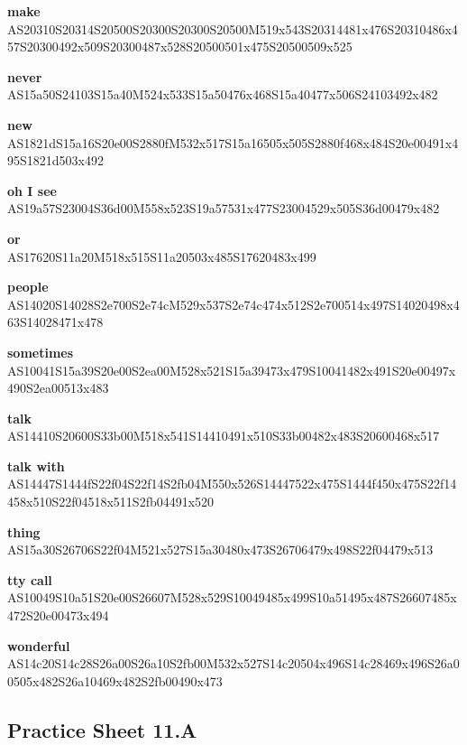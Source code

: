\documentclass{article}
\begin{document}
\begin{glossary}
\textbf{make}\\
AS20310S20314S20500S20300S20300S20500M519x543S20314481x476S20310486x457S20300492x509S20300487x528S20500501x475S20500509x525

\textbf{never}\\
AS15a50S24103S15a40M524x533S15a50476x468S15a40477x506S24103492x482

\textbf{new}\\
AS1821dS15a16S20e00S2880fM532x517S15a16505x505S2880f468x484S20e00491x495S1821d503x492

\textbf{oh I see}\\
AS19a57S23004S36d00M558x523S19a57531x477S23004529x505S36d00479x482

\textbf{or}\\
AS17620S11a20M518x515S11a20503x485S17620483x499

\textbf{people}\\
AS14020S14028S2e700S2e74cM529x537S2e74c474x512S2e700514x497S14020498x463S14028471x478

\textbf{sometimes}\\
AS10041S15a39S20e00S2ea00M528x521S15a39473x479S10041482x491S20e00497x490S2ea00513x483

\textbf{talk}\\
AS14410S20600S33b00M518x541S14410491x510S33b00482x483S20600468x517

\textbf{talk with}\\
AS14447S1444fS22f04S22f14S2fb04M550x526S14447522x475S1444f450x475S22f14458x510S22f04518x511S2fb04491x520

\textbf{thing}\\
AS15a30S26706S22f04M521x527S15a30480x473S26706479x498S22f04479x513

\textbf{tty call}\\
AS10049S10a51S20e00S26607M528x529S10049485x499S10a51495x487S26607485x472S20e00473x494

\textbf{wonderful}\\
AS14c20S14c28S26a00S26a10S2fb00M532x527S14c20504x496S14c28469x496S26a00505x482S26a10469x482S2fb00490x473

\end{glossary}

\subsection{Practice Sheet 11.A}
\end{document}
